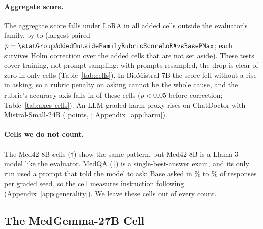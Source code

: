 \documentclass{article}
\begin{document}
\paragraph{Aggregate score.} The aggregate score falls under LoRA in all
\statGroupAddedOutsideFamilyRubricScoreLoRAvsBaseMeasured{} added cells outside the evaluator's family, by
\statGroupAddedOutsideFamilyRubricScoreLoRAvsBaseAbsMin{} to
\statGroupAddedOutsideFamilyRubricScoreLoRAvsBaseAbsMax{} (largest paired $p =
\statGroupAddedOutsideFamilyRubricScoreLoRAvsBasePMax$; each survives Holm correction over the
\statGroupAddedKeptCells{} added cells that are not set aside). These tests cover training, not
prompt sampling: with prompts resampled, the drop is clear of zero in only
\statGroupAddedOutsideFamilyAggregateFellBoot{} cells (Table~\ref{tab:cells}). In BioMistral-7B the
score fell without a rise in asking, so a rubric penalty on asking cannot be the whole cause, and
the rubric's accuracy axis falls in \statGroupAddedOutsideFamilyAccuracyFell{} of these cells ($p < 0.05$
before correction; Table~\ref{tab:axes-cells}). An LLM-graded harm proxy rises on ChatDoctor with
Mistral-Small-24B (\statCDMistralJulNegAnyLoRAvsBaseDiff{} points,
\statCDMistralJulNegAnyLoRAvsBaseCI; Appendix~\ref{app:harm}).

\paragraph{Cells we do not count.} The \statGroupFamilyWaiverCells{} Med42-8B cells ($\dagger$) show the
same pattern, but Med42-8B is a Llama-3 model like the evaluator. MedQA ($\ddagger$) is a
single-best-answer exam, and its only run used a prompt that told the model to ask: Base asked in
\statMedQAPreMistralJulActiveInquiryBaseSeedMin\% to \statMedQAPreMistralJulActiveInquiryBaseSeedMax\% of
responses per graded seed, so the cell measures instruction following
(Appendix~\ref{app:generality}). We leave these cells out of every count.

\subsection{The MedGemma-27B Cell}
\label{sec:main}
\end{document}
